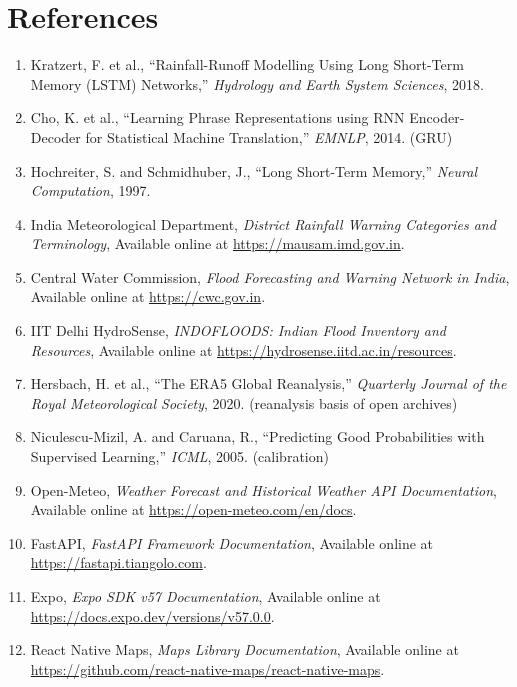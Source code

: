 \documentclass[a4paper,12pt]{report}
\begin{document}
\chapter{References}
\vspace{-1em}
\begin{enumerate}[leftmargin=0.65cm,itemsep=0.5em,topsep=0pt]
    \item Kratzert, F. et al., ``Rainfall-Runoff Modelling Using Long Short-Term Memory (LSTM) Networks,'' \textit{Hydrology and Earth System Sciences}, 2018.
    \item Cho, K. et al., ``Learning Phrase Representations using RNN Encoder-Decoder for Statistical Machine Translation,'' \textit{EMNLP}, 2014. (GRU)
    \item Hochreiter, S. and Schmidhuber, J., ``Long Short-Term Memory,'' \textit{Neural Computation}, 1997.
    \item India Meteorological Department, \textit{District Rainfall Warning Categories and Terminology}, Available online at \url{https://mausam.imd.gov.in}.
    \item Central Water Commission, \textit{Flood Forecasting and Warning Network in India}, Available online at \url{https://cwc.gov.in}.
    \item IIT Delhi HydroSense, \textit{INDOFLOODS: Indian Flood Inventory and Resources}, Available online at \url{https://hydrosense.iitd.ac.in/resources}.
    \item Hersbach, H. et al., ``The ERA5 Global Reanalysis,'' \textit{Quarterly Journal of the Royal Meteorological Society}, 2020. (reanalysis basis of open archives)
    \item Niculescu-Mizil, A. and Caruana, R., ``Predicting Good Probabilities with Supervised Learning,'' \textit{ICML}, 2005. (calibration)
    \item Open-Meteo, \textit{Weather Forecast and Historical Weather API Documentation}, Available online at \url{https://open-meteo.com/en/docs}.
    \item FastAPI, \textit{FastAPI Framework Documentation}, Available online at \url{https://fastapi.tiangolo.com}.
    \item Expo, \textit{Expo SDK v57 Documentation}, Available online at \url{https://docs.expo.dev/versions/v57.0.0}.
    \item React Native Maps, \textit{Maps Library Documentation}, Available online at \url{https://github.com/react-native-maps/react-native-maps}.
\end{enumerate}
\end{document}
